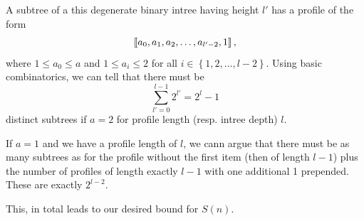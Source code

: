 A subtree of a this degenerate binary intree having height $l'$ has a profile of the form
\begin{equation*}
  \left\llbracket a_0,a_1,a_2,\dots,a_{l'-2},1 \right\rrbracket,
\end{equation*}
where $1\leq a_0\leq a$ and $1\leq a_i \leq 2$ for all $i\in\left\{ 1,2,\dots,l-2 \right\}$. Using basic combinatorics, we can tell that there must be
\begin{equation*}
  \sum_{l'=0}^{l-1} 2^{l'} = 2^{l} -1
\end{equation*}
distinct subtrees if $a=2$ for profile length (resp. intree depth) $l$.

If $a=1$ and we have a profile length of $l$, we cann argue that there must be as many subtrees as for the profile without the first item (then of length $l-1$) plus the number of profiles of length exactly $l-1$ with one additional 1 prepended. These are exactly $2^{l-2}$.

This, in total leads to our desired bound for $S(n)$.

